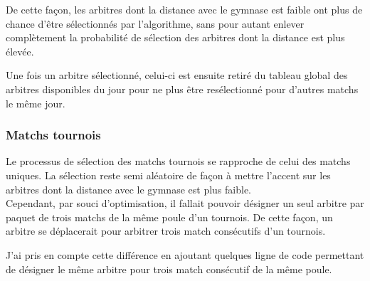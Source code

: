 De cette façon, les arbitres dont la distance avec le gymnase est faible ont plus de chance d’être sélectionnés par l’algorithme, sans pour autant enlever complètement la probabilité de sélection des arbitres dont la distance est plus élevée.

Une fois un arbitre sélectionné, celui-ci est ensuite retiré du tableau global des arbitres disponibles du jour pour ne plus être resélectionné pour d’autres matchs le même jour.

\subsubsection{Matchs tournois}
\vspace{1cm}

Le processus de sélection des matchs tournois se rapproche de celui des matchs uniques.
La sélection reste semi aléatoire de façon à mettre l’accent sur les arbitres dont la distance avec le gymnase est plus faible.  \\

Cependant, par souci d’optimisation, il fallait pouvoir désigner un seul arbitre par paquet de trois matchs de la même poule d’un tournois. 
De cette façon, un arbitre se déplacerait pour arbitrer trois match consécutifs d’un tournois.

J’ai pris en compte cette différence en ajoutant quelques ligne de code permettant de désigner le même arbitre pour trois match consécutif de la même poule.